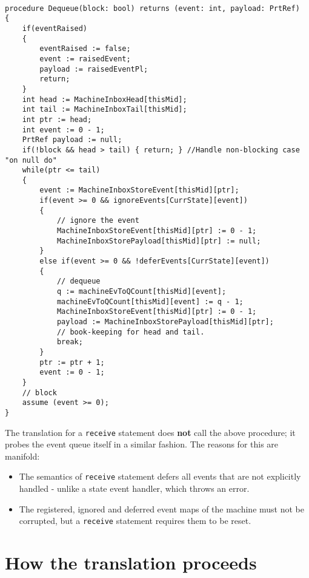 \documentclass{llncs}
\begin{document}
\begin{verbatim}

procedure Dequeue(block: bool) returns (event: int, payload: PrtRef)
{
    if(eventRaised)
    {
        eventRaised := false;
        event := raisedEvent;
        payload := raisedEventPl;
        return;
    }
    int head := MachineInboxHead[thisMid];
    int tail := MachineInboxTail[thisMid];
    int ptr := head;
    int event := 0 - 1;
    PrtRef payload := null;
    if(!block && head > tail) { return; } //Handle non-blocking case "on null do"
    while(ptr <= tail)
    {
        event := MachineInboxStoreEvent[thisMid][ptr];
        if(event >= 0 && ignoreEvents[CurrState][event])
        {
            // ignore the event
            MachineInboxStoreEvent[thisMid][ptr] := 0 - 1;
            MachineInboxStorePayload[thisMid][ptr] := null;
        }
        else if(event >= 0 && !deferEvents[CurrState][event])
        {
            // dequeue
            q := machineEvToQCount[thisMid][event];
            machineEvToQCount[thisMid][event] := q - 1;
            MachineInboxStoreEvent[thisMid][ptr] := 0 - 1;
            payload := MachineInboxStorePayload[thisMid][ptr];
            // book-keeping for head and tail.
            break;
        }
        ptr := ptr + 1;
        event := 0 - 1;
    }
    // block
    assume (event >= 0);
}
\end{verbatim}

The translation for a \texttt{receive} statement does \textbf{not} call the above procedure; it probes the event queue itself in a similar fashion. The reasons for this are manifold:
\begin{itemize}
\item The semantics of \texttt{receive} statement defers all events that are not explicitly handled - unlike a state event handler, which throws an error.
\item The registered, ignored and deferred event maps of the machine must not be corrupted, but a \texttt{receive} statement requires them to be reset.
\end{itemize}

\pagebreak

\section{How the translation proceeds}
\end{document}
